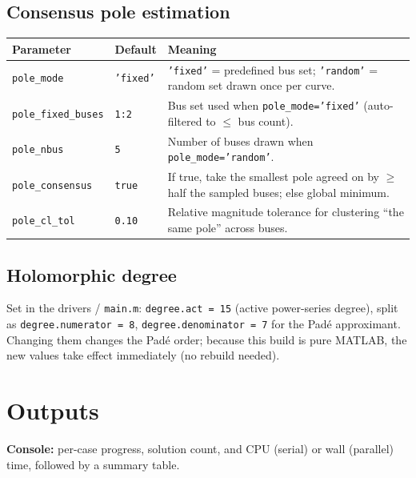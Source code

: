 \documentclass[11pt,a4paper]{article}
\newcommand{\code}[1]{\texttt{#1}}
\begin{document}
\subsection{Consensus pole estimation}
\begin{center}\small
\begin{longtable}{@{}p{}p{}p{}@{}}
\toprule
\textbf{Parameter} & \textbf{Default} & \textbf{Meaning}\\
\midrule\endhead
\code{pole_mode}       & \code{'fixed'}  & \code{'fixed'} = predefined bus set; \code{'random'} = random set drawn once per curve.\\
\code{pole_fixed_buses}& \code{1:2}      & Bus set used when \code{pole_mode='fixed'} (auto-filtered to $\le$ bus count).\\
\code{pole_nbus}       & \code{5}        & Number of buses drawn when \code{pole_mode='random'}.\\
\code{pole_consensus}  & \code{true}     & If true, take the smallest pole agreed on by $\ge$ half the sampled buses; else global minimum.\\
\code{pole_cl_tol}     & \code{0.10}     & Relative magnitude tolerance for clustering ``the same pole'' across buses.\\
\bottomrule
\end{longtable}
\end{center}

\subsection{Holomorphic degree}
Set in the drivers / \code{main.m}: \code{degree.act = 15} (active power-series degree),
split as \code{degree.numerator = 8}, \code{degree.denominator = 7} for the Pad\'e
approximant. Changing them changes the Pad\'e order; because this build is pure MATLAB,
the new values take effect immediately (no rebuild needed).

\section{Outputs}

\textbf{Console:} per-case progress, solution count, and CPU (serial) or wall (parallel)
time, followed by a summary table.
\end{document}

